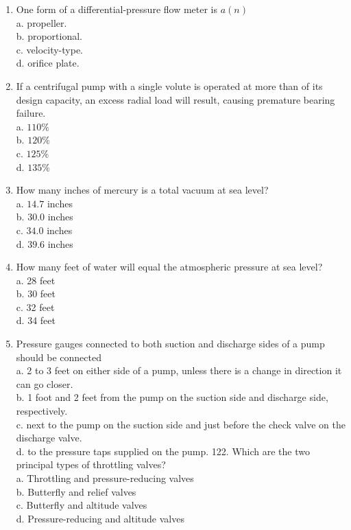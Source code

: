 \documentclass[10pt]{article}
\begin{document}
\begin{enumerate}
  \item One form of a differential-pressure flow meter is $a(n)$\\
a. propeller.\\
b. proportional.\\
c. velocity-type.\\
d. orifice plate.

  \item If a centrifugal pump with a single volute is operated at more than of its design capacity, an excess radial load will result, causing premature bearing failure.\\
a. $110 \%$\\
b. $120 \%$\\
c. $125 \%$\\
d. $135 \%$

  \item How many inches of mercury is a total vacuum at sea level?\\
a. $14.7$ inches\\
b. $30.0$ inches\\
c. $34.0$ inches\\
d. $39.6$ inches

  \item How many feet of water will equal the atmospheric pressure at sea level?\\
a. 28 feet\\
b. 30 feet\\
c. 32 feet\\
d. 34 feet

  \item Pressure gauges connected to both suction and discharge sides of a pump should be connected\\
a. 2 to 3 feet on either side of a pump, unless there is a change in direction it can go closer.\\
b. 1 foot and 2 feet from the pump on the suction side and discharge side, respectively.\\
c. next to the pump on the suction side and just before the check valve on the discharge valve.\\
d. to the pressure taps supplied on the pump. 122. Which are the two principal types of throttling valves?\\
a. Throttling and pressure-reducing valves\\
b. Butterfly and relief valves\\
c. Butterfly and altitude valves\\
d. Pressure-reducing and altitude valves


\end{enumerate}
\end{document}
